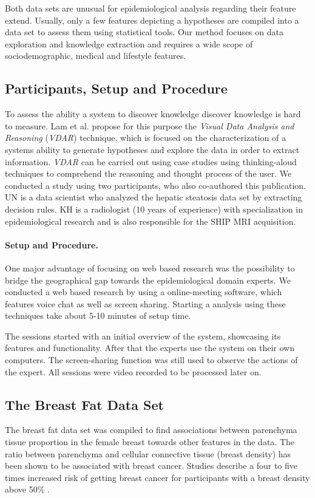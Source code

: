 \documentclass[journal]{style/vgtc} 			          %
\begin{document}
Both data sets are unusual for epidemiological analysis regarding their feature extend.
Usually, only a few features depicting a hypotheses are compiled into a data set to assess them using statistical tools.
Our method focuses on data exploration and knowledge extraction and requires a wide scope of sociodemographic, medical and lifestyle features.
\subsection{Participants, Setup and Procedure}
To assess the ability a system to discover knowledge discover knowledge is hard to measure.
Lam et al. \cite{Lam2012} propose for this purpose the \emph{Visual Data Analysis and Reasoning} (\emph{VDAR}) technique, which is focused on the characterization of a systems ability to generate hypotheses and explore the data in order to extract information.
\emph{VDAR} can be carried out using case studies using thinking-aloud techniques to comprehend the reasoning and thought process of the user.
We conducted a study using two participants, who also co-authored this publication.
UN is a data scientist who analyzed the hepatic steatosis data set by extracting decision rules.
KH is a radiologist (10 years of experience) with specialization in epidemiological research and is also responsible for the SHIP MRI acquisition.
\paragraph{Setup and Procedure.}
One major advantage of focusing on web based research was the possibility to bridge the geographical gap towards the epidemiological domain experts.
We conducted a web based research by using a online-meeting software, which features voice chat as well as screen sharing.
Starting a analysis using these techniques take about 5-10 minutes of setup time.

The sessions started with an initial overview of the system, showcasing its features and functionality.
After that the experts use the system on their own computers.
The screen-sharing function was still used to observe the actions of the expert.
All sessions were video recorded to be processed later on.
\subsection{The Breast Fat Data Set}
The breast fat data set was compiled to find associations between parenchyma tissue proportion in the female breast towards other features in the data.
The ratio between parenchyma and cellular connective tissue (breast density) has been shown to be associated with breast cancer.
Studies describe a four to five times increased risk of getting breast cancer for participants with a breast density above 50\% \cite{Mccormack2006}.
\end{document}
